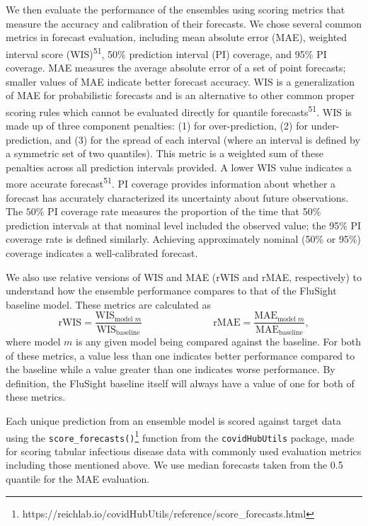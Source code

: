 \documentclass[
  letterpaper,
  DIV=11,
  numbers=noendperiod]{scrartcl}
\begin{document}
We then evaluate the performance of the ensembles using scoring metrics
that measure the accuracy and calibration of their forecasts. We chose
several common metrics in forecast evaluation, including mean absolute
error (MAE), weighted interval score (WIS)\textsuperscript{51}, 50\%
prediction interval (PI) coverage, and 95\% PI coverage. MAE measures
the average absolute error of a set of point forecasts; smaller values
of MAE indicate better forecast accuracy. WIS is a generalization of MAE
for probabilistic forecasts and is an alternative to other common proper
scoring rules which cannot be evaluated directly for quantile
forecasts\textsuperscript{51}. WIS is made up of three component
penalties: (1) for over-prediction, (2) for under-prediction, and (3)
for the spread of each interval (where an interval is defined by a
symmetric set of two quantiles). This metric is a weighted sum of these
penalties across all prediction intervals provided. A lower WIS value
indicates a more accurate forecast\textsuperscript{51}. PI coverage
provides information about whether a forecast has accurately
characterized its uncertainty about future observations. The \(50\)\% PI
coverage rate measures the proportion of the time that 50\% prediction
intervals at that nominal level included the observed value; the 95\% PI
coverage rate is defined similarly. Achieving approximately nominal
(50\% or 95\%) coverage indicates a well-calibrated forecast.

We also use relative versions of WIS and MAE (rWIS and rMAE,
respectively) to understand how the ensemble performance compares to
that of the FluSight baseline model. These metrics are calculated as
\[\textrm{rWIS} = \frac{\textrm{WIS}_{\textrm{model }m}}{\textrm{WIS}_{\textrm{baseline}}} \hspace{3cm} \textrm{rMAE} = \frac{\textrm{MAE}_{\textrm{model }m}}{\textrm{MAE}_{\textrm{baseline}}},\]
where model \(m\) is any given model being compared against the
baseline. For both of these metrics, a value less than one indicates
better performance compared to the baseline while a value greater than
one indicates worse performance. By definition, the FluSight baseline
itself will always have a value of one for both of these metrics.

Each unique prediction from an ensemble model is scored against target
data using the \texttt{score\_forecasts()}\footnote{https://reichlab.io/covidHubUtils/reference/score\_forecasts.html}
function from the \texttt{covidHubUtils} package, made for scoring
tabular infectious disease data with commonly used evaluation metrics
including those mentioned above. We use median forecasts taken from the
0.5 quantile for the MAE evaluation.
\end{document}
